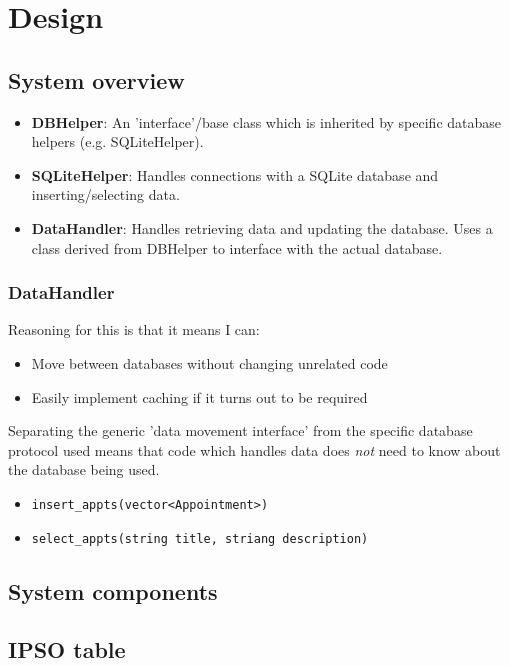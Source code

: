 \section{Design}
\subsection{System overview}

\begin{itemize}
    \item \textbf{DBHelper}: An 'interface'/base class which is inherited by
        specific database helpers (e.g. SQLiteHelper).
    \item \textbf{SQLiteHelper}: Handles connections with a SQLite database and
        inserting/selecting data.
    \item \textbf{DataHandler}: Handles retrieving data and updating the
        database. Uses a class derived from DBHelper to interface with the
        actual database.
\end{itemize}


\subsubsection{DataHandler}

Reasoning for this is that it means I can:

\begin{itemize}
    \item Move between databases without changing unrelated code
    \item Easily implement caching if it turns out to be required
\end{itemize}

Separating the generic 'data movement interface' from the specific database
protocol used means that code which handles data does \textit{not} need to know
about the database being used.

\begin{itemize}
    \item \texttt{insert_appts(vector<Appointment>)}
    \item \texttt{select_appts(string title, striang description)}
\end{itemize}


\subsection{System components}
\subsection{IPSO table}

